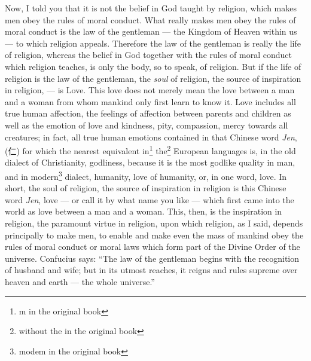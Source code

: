 Now, I told you that it is not the belief in God taught by religion, which makes men obey the rules of moral conduct.
What really makes men obey the rules of moral conduct is the law of the gentleman --- the Kingdom of Heaven within us --- to which religion appeals.
Therefore the law of the gentleman is really the life of religion, whereas the belief in God together with the rules of moral conduct which religion teaches, is only the body, so to speak, of religion.
But if the life of religion is the law of the gentleman, the \emph{soul} of religion, the source of inspiration in religion, --- is Love.
This love does not merely mean the love between a man and a woman from whom mankind only first learn to know it.
Love includes all true human affection, the feelings of affection between parents and children as well as the emotion of love and kindness, pity, compassion, mercy towards all creatures; in fact, all true human emotions contained in that Chinese word \emph{Jen}, (仁) for which the nearest equivalent in\footnote{m in the original book} the\footnote{without the in the original book} European languages is, in the old dialect of Christianity, godliness, because it is the most godlike quality in man, and in modern\footnote{modem in the original book} dialect, humanity, love of humanity, or, in one word, love.
In short, the soul of religion, the source of inspiration in religion is this Chinese word \emph{Jen}, love --- or call it by what name you like --- which first came into the world as love between a man and a woman.
This, then, is the inspiration in religion, the paramount virtue in religion, upon which religion, as I said, depends principally to make men, to enable and make even the mass of mankind obey the rules of moral conduct or moral laws which form part of the Divine Order of the universe.
Confucius says: ``The law of the gentleman begins with the recognition of husband and wife; but in its utmost reaches, it reigns and rules supreme over heaven and earth --- the whole universe.''

